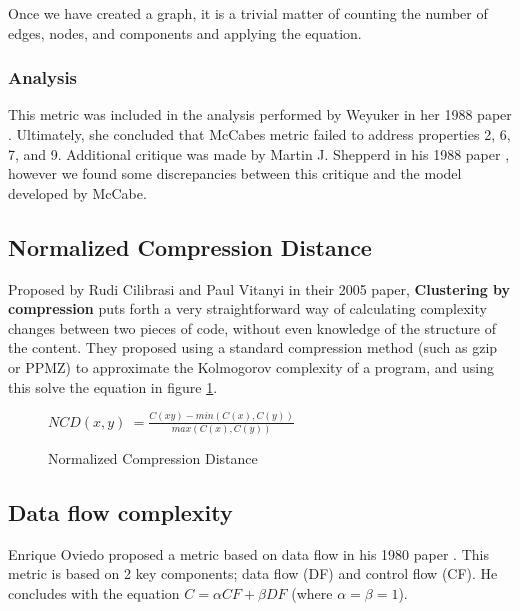 \documentclass[]{article}
\begin{document}
Once we have created a graph, it is a trivial matter of counting the number of edges, nodes, and components and applying the equation.

\subsubsection{Analysis}

This metric was included in the analysis performed by Weyuker in her 1988 paper \cite{ref:evaluating_software_complexity_measures}.
Ultimately, she concluded that McCabes metric failed to address properties 2, 6, 7, and 9.
Additional critique was made by Martin J. Shepperd in his 1988 paper \cite{shepperd1988critique}, however we found some discrepancies between this critique and the model developed by McCabe.

\subsection{Normalized Compression Distance}

Proposed by Rudi Cilibrasi and Paul Vitanyi in their 2005 paper, \textbf{Clustering by compression} \cite{ref:cilibrasi2005clustering} puts forth a very straightforward way of calculating complexity changes between two pieces of code, without even knowledge of the structure of the content.
They proposed using a standard compression method (such as gzip or PPMZ) to approximate the Kolmogorov complexity of a program, and using this solve the equation in figure \ref{ncd_eq_1}.


\begin{figure}[h]
	\caption{Normalized Compression Distance}
	\label{ncd_eq_1}
	\centering
	$NCD(x,y) ~= \frac{C(xy) - min(C(x),C(y))}{max(C(x),C(y))}$
\end{figure}


\subsection{Data flow complexity}

Enrique Oviedo proposed a metric based on data flow in his 1980 paper \cite{ref:oviedo1993control}.
This metric is based on 2 key components; data flow (DF) and control flow (CF).
He concludes with the equation $C = \alpha CF + \beta DF$ (where $\alpha=\beta=1$).
\end{document}
